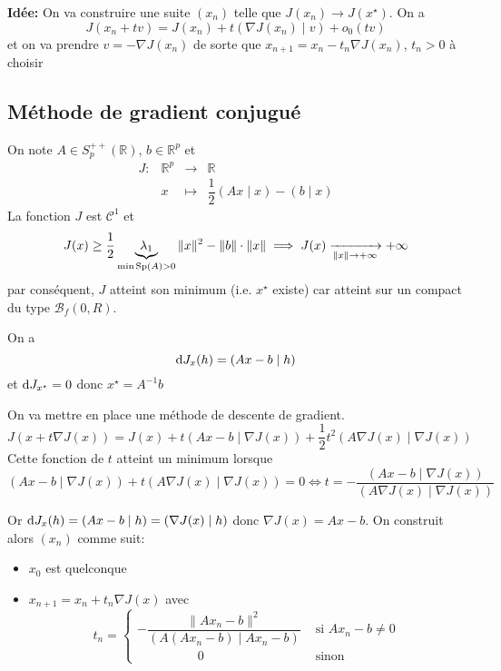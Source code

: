 \textbf{Idée:} On va construire une suite $(x_n)$ telle que $J(x_n)\to J(x^\star)$. On a \[
    J(x_n+tv)=J(x_n)+t(\nabla J(x_n)\;|\; v)+o_0(tv)
\]
et on va prendre $v=-\nabla J(x_n)$ de sorte que $x_{n+1}=x_n-t_n\nabla J(x_n)$, $t_n>0$ à choisir

\subsection{Méthode de gradient conjugué}


On note $A\in S_p^{++}(\mathbb R)$, $b\in\mathbb R^p$ et \[
    \begin{matrix}
        J: & \mathbb R^p & \longrightarrow & \mathbb R \\
           & x & \longmapsto & \dfrac12(Ax\;|\;x)-(b\;|\;x)
    \end{matrix}
\]
La fonction $J$ est $\mathcal C^1$ et \[
    J(x)\geq \frac 12 \underbrace{\lambda_1}_{\min \mathrm{Sp}(A)>0}\|x\|^2-\|b\|\cdot \|x\| \implies J(x)\xrightarrow[\|x\|\to +\infty]{}+\infty
\]
par conséquent, $J$ atteint son minimum (i.e. $x^\star$ existe) car atteint sur un compact du type $\mathcal B_f(0, R)$.

On a \[
    \mathrm{d} J_x(h)=(Ax-b\;|\;h)
\]
et $\mathrm{d} J_{x^\star}=0$ donc $x^\star=A^{-1}b$

On va mettre en place une méthode de descente de gradient. \[
    J(x+t\nabla J(x))=J(x)+ t (Ax-b\;|\;\nabla J(x))+\frac12t^2(A\nabla J(x)\;|\;\nabla J(x))
\]
Cette fonction de $t$ atteint un minimum lorsque \[
    (Ax-b\;|\;\nabla J(x))+t(A\nabla J(x)\;|\; \nabla J(x))=0 \iff t=-\frac{(Ax-b\;|\;\nabla J(x))}{(A\nabla J(x)\;|\; \nabla J(x))}
\]

Or $\mathrm{d} J_x(h)=(Ax-b\;|\;h)=(\nabla J(x)\;|\; h)$ donc $\nabla J(x)=Ax-b$. On construit alors $(x_n)$ comme suit: \begin{itemize}
    \item $x_0$ est quelconque
    \item $x_{n+1}=x_n+t_n\nabla J(x)$ avec \[
            t_n = \begin{cases}
                -\dfrac{\|Ax_n-b\|^2}{(A(Ax_n-b)\;|\;Ax_n-b)} &\text{ si } Ax_n-b\neq 0 \\[1em]
                \hspace{2cm}0 &\text{ sinon }
            \end{cases}
        \]
\end{itemize}

